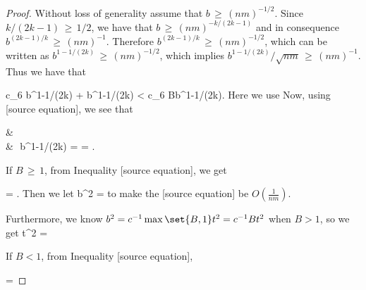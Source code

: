 \documentclass[twoside,11pt]{article}
\makeatletter
\newcommand{\discardlabel}[1]{}
\newcommand{\discardtwo}[2]{}
\newcommand{\legacyref}[1]{\textup{[source ref.]}}
\newcommand{\legacyeqref}[1]{\textup{[source equation]}}
\newenvironment{legacycomparison}{%
  \begingroup\color{legacygray}%
  \let\label\discardlabel
  \let\originallabel\discardlabel
  \let\ref\legacyref
  \let\pageref\legacyref
  \let\eqref\legacyeqref
  \let\cref\legacyref
  \let\Cref\legacyref
  \let\autoref\legacyref
  \let\aliasref\discardtwo
}{\endgroup}
\newcommand{\aliasref}[2]{%
  \@ifundefined{r@#2}{}{%
    \expandafter\let\csname r@#1\expandafter\endcsname\csname r@#2\endcsname}}
\makeatother
\begin{document}
\begin{legacycomparison}
\begin{proof}
Without loss of generality assume that $b \,\geq\, (nm)^{-1/2}$. Since $k/(2k-1) \,\geq\, 1/2$, we have that $b \,\geq\, (nm)^{-k/(2k-1)}$ and in consequence $b^{(2k-1)/k} \,\geq\, (nm)^{-1}$. Therefore $b^{(2k-1)/k} \,\geq\, (nm)^{-1/2}$, which can be written as $b^{1-1/(2k)} \,\geq\, (nm)^{-1/2}$, which implies $b^{1-1/(2k)}/\sqrt{nm} \,\geq\, (nm)^{-1}$. Thus we have that 
\beq 
\label{b_in256}
c_6 b^{1-1/(2k)} + b^{1-1/(2k)} < c_6 Bb^{1-1/(2k)}.
\beq 
Here we use 
Now, using \eqref{b_in256}, we see that 
\beq 
\label{in_271}
& \\ 
&\,\leq\, b^{1-1/(2k)} =   = .
\beq 



If $B \,\geq\, 1$, from Inequality \eqref{in_271},
we get 
\beq 
\label{840}
 = .
\beq 
Then we let 
\bea 
b^2 = 
\bea to make  
the \eqref{840} be $O\left(\frac{1}{nm}\right)$. 
 
Furthermore, we know $b^2 = c^{-1}\max\set{B,1}t^2 = c^{-1}Bt^2$ when $B> 1$, so we get 
\bea 
t^2 = 
\bea 





If  $B < 1$, from Inequality \eqref{in_271}, 

\beq 
\label{840__duplicate2}
 = 
\beq 


\end{proof}
\end{legacycomparison}
\end{document}
